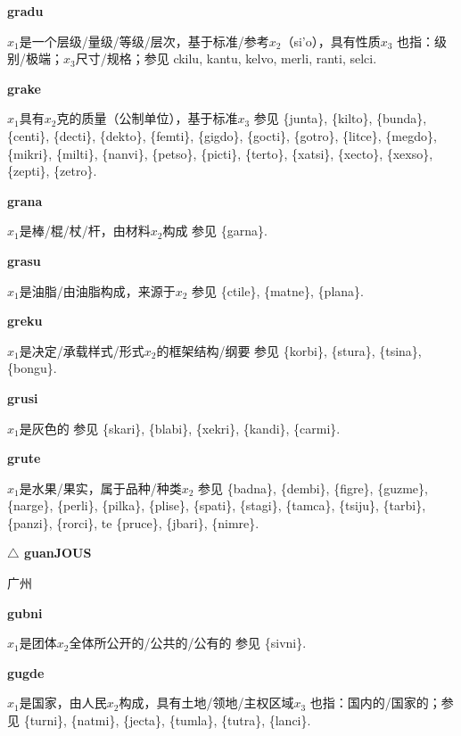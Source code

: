 \documentclass[notitlepage,twocolumn,a4paper,10pt]{book}
\begin{document}
{{\sffamily\bfseries gradu}\enspace {\ttfamily\bfseries[        rau]}  $x_1$是一个层级\slash{}量级\slash{}等级\slash{}层次，基于标准\slash{}参考$x_2$（si'o），具有性质$x_3$ \textemdash{} 也指：级别\slash{}极端；$x_3$尺寸\slash{}规格；参见 {ckilu}, {kantu}, {kelvo}, {merli}, {ranti}, {selci}.

{\sffamily\bfseries grake}\enspace {\ttfamily\bfseries[    gra]}  $x_1$具有$x_2$克的质量（公制单位），基于标准$x_3$ \textemdash{} 参见 \{junta\}, \{kilto\}, \{bunda\}, \{centi\}, \{decti\}, \{dekto\}, \{femti\}, \{gigdo\}, \{gocti\}, \{gotro\}, \{litce\}, \{megdo\}, \{mikri\}, \{milti\}, \{nanvi\}, \{petso\}, \{picti\}, \{terto\}, \{xatsi\}, \{xecto\}, \{xexso\}, \{zepti\}, \{zetro\}.

{\sffamily\bfseries grana}\enspace {\ttfamily\bfseries[        ga'a]}  $x_1$是棒\slash{}棍\slash{}杖\slash{}杆，由材料$x_2$构成 \textemdash{} 参见 \{garna\}.

{\sffamily\bfseries grasu}\enspace {\ttfamily\bfseries[ras]}  $x_1$是油脂\slash{}由油脂构成，来源于$x_2$ \textemdash{} 参见 \{ctile\}, \{matne\}, \{plana\}.

{\sffamily\bfseries greku}\enspace {\ttfamily\bfseries[rek]}  $x_1$是决定\slash{}承载样式\slash{}形式$x_2$的框架结构\slash{}纲要 \textemdash{} 参见 \{korbi\}, \{stura\}, \{tsina\}, \{bongu\}.

{\sffamily\bfseries grusi}\enspace {\ttfamily\bfseries[rus]}  $x_1$是灰色的 \textemdash{} 参见 \{skari\}, \{blabi\}, \{xekri\}, \{kandi\}, \{carmi\}.

{\sffamily\bfseries grute}\enspace {\ttfamily\bfseries[rut]}  $x_1$是水果\slash{}果实，属于品种\slash{}种类$x_2$ \textemdash{} 参见 \{badna\}, \{dembi\}, \{figre\}, \{guzme\}, \{narge\}, \{perli\}, \{pilka\}, \{plise\}, \{spati\}, \{stagi\}, \{tamca\}, \{tsiju\}, \{tarbi\}, \{panzi\}, \{rorci\}, te \{pruce\}, \{jbari\}, \{nimre\}.

{\sffamily\bfseries $\triangle$ guanJOUS} 广州

{\sffamily\bfseries gubni}\enspace {\ttfamily\bfseries[gub]}  $x_1$是团体$x_2$全体所公开的\slash{}公共的\slash{}公有的 \textemdash{} 参见 \{sivni\}.

{\sffamily\bfseries gugde}\enspace {\ttfamily\bfseries[gug     gu'e]}  $x_1$是国家，由人民$x_2$构成，具有土地\slash{}领地\slash{}主权区域$x_3$ \textemdash{} 也指：国内的\slash{}国家的；参见 \{turni\}, \{natmi\}, \{jecta\}, \{tumla\}, \{tutra\}, \{lanci\}.

}
\end{document}
